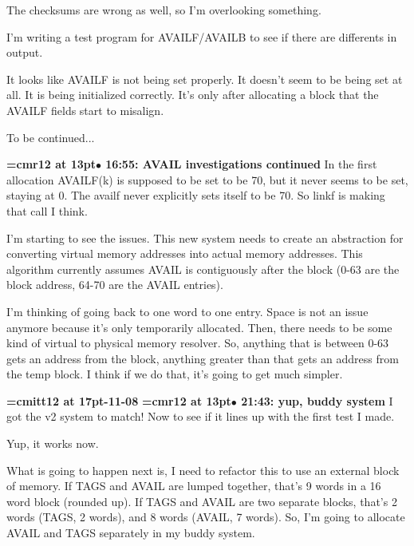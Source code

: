 The checksums are wrong as well, so I'm overlooking something.
\par

I'm writing a test program for AVAILF/AVAILB to see if there are differents in output.
\par

It looks like AVAILF is not being set properly. It doesn't seem to be being set at all. It is being initialized correctly. It's only after allocating a block that the AVAILF fields start to misalign.
\par

To be continued...
\par

{\smallskip\noindent\bf\font\titlefont=cmr12 at 13pt\titlefont $\bullet$ 16:55: AVAIL investigations continued}\smallskip
In the first allocation AVAILF(k) is supposed to be set to be 70, but it never seems to be set, staying at 0. The availf never explicitly sets itself to be 70. So linkf is making that call I think.
\par

I'm starting to see the issues. This new system needs to create an abstraction for converting virtual memory addresses into actual memory addresses. This algorithm currently assumes AVAIL is contiguously after the block (0-63 are the block address, 64-70 are the AVAIL entries).
\par

I'm thinking of going back to one word to one entry. Space is not an issue anymore because it's only temporarily allocated. Then, there needs to be some kind of virtual to physical memory resolver. So, anything that is between 0-63 gets an address from the block, anything greater than that gets an address from the temp block. I think if we do that, it's going to get much simpler.
\par

{\medskip\noindent\bf\font\titlefont=cmitt12 at 17pt-11-08}\medskip
{\smallskip\noindent\bf\font\titlefont=cmr12 at 13pt\titlefont $\bullet$ 21:43: yup, buddy system}\smallskip
I got the v2 system to match! Now to see if it lines up with the first test I made.
\par

Yup, it works now.
\par

What is going to happen next is, I need to refactor this to use an external block of memory. If TAGS and AVAIL are lumped together, that's 9 words in a 16 word block (rounded up). If TAGS and AVAIL are two separate blocks, that's 2 words (TAGS, 2 words), and 8 words (AVAIL, 7 words). So, I'm going to allocate AVAIL and TAGS separately in my buddy system.
\par


